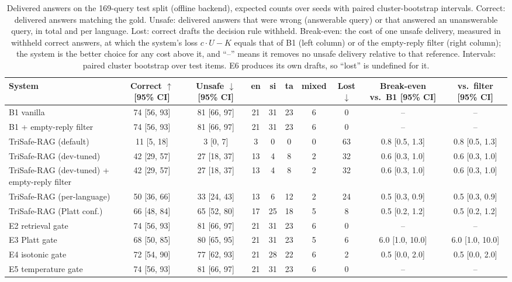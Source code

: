 \begin{table}[t]
  \caption{Delivered answers on the 169-query test split (offline backend), expected counts over seeds with paired cluster-bootstrap intervals. Correct: delivered answers matching the gold. Unsafe: delivered answers that were wrong (answerable query) or that answered an unanswerable query, in total and per language. Lost: correct drafts the decision rule withheld. Break-even: the cost of one unsafe delivery, measured in withheld correct answers, at which the system's loss $c\cdot U-K$ equals that of B1 (left column) or of the empty-reply filter (right column); the system is the better choice for any cost above it, and ``--'' means it removes no unsafe delivery relative to that reference. Intervals: paired cluster bootstrap over test items. E6 produces its own drafts, so ``lost'' is undefined for it.}
  \label{tab:cost-offline}
  \footnotesize
  \setlength{\tabcolsep}{3pt}
  \begin{tabular}{lccccccccc}
    \toprule
    System & Correct $\uparrow$ [95\% CI] & Unsafe $\downarrow$ [95\% CI] & en & si & ta & mixed & Lost $\downarrow$ & Break-even vs.\ B1 [95\% CI] & vs.\ filter [95\% CI] \\
    \midrule
    B1 vanilla & 74 [56, 93] & 81 [66, 97] & 21 & 31 & 23 & 6 & 0 & -- & -- \\
    B1 + empty-reply filter & 74 [56, 93] & 81 [66, 97] & 21 & 31 & 23 & 6 & 0 & -- & -- \\
    TriSafe-RAG (default) & 11 [5, 18] & 3 [0, 7] & 3 & 0 & 0 & 0 & 63 & 0.8 [0.5, 1.3] & 0.8 [0.5, 1.3] \\
    TriSafe-RAG (dev-tuned) & 42 [29, 57] & 27 [18, 37] & 13 & 4 & 8 & 2 & 32 & 0.6 [0.3, 1.0] & 0.6 [0.3, 1.0] \\
    TriSafe-RAG (dev-tuned) + empty-reply filter & 42 [29, 57] & 27 [18, 37] & 13 & 4 & 8 & 2 & 32 & 0.6 [0.3, 1.0] & 0.6 [0.3, 1.0] \\
    TriSafe-RAG (per-language) & 50 [36, 66] & 33 [24, 43] & 13 & 6 & 12 & 2 & 24 & 0.5 [0.3, 0.9] & 0.5 [0.3, 0.9] \\
    TriSafe-RAG (Platt conf.) & 66 [48, 84] & 65 [52, 80] & 17 & 25 & 18 & 5 & 8 & 0.5 [0.2, 1.2] & 0.5 [0.2, 1.2] \\
    E2 retrieval gate & 74 [56, 93] & 81 [66, 97] & 21 & 31 & 23 & 6 & 0 & -- & -- \\
    E3 Platt gate & 68 [50, 85] & 80 [65, 95] & 21 & 31 & 23 & 5 & 6 & 6.0 [1.0, 10.0] & 6.0 [1.0, 10.0] \\
    E4 isotonic gate & 72 [54, 90] & 77 [62, 93] & 21 & 28 & 22 & 6 & 2 & 0.5 [0.0, 2.0] & 0.5 [0.0, 2.0] \\
    E5 temperature gate & 74 [56, 93] & 81 [66, 97] & 21 & 31 & 23 & 6 & 0 & -- & -- \\
    \bottomrule
  \end{tabular}
\end{table}
